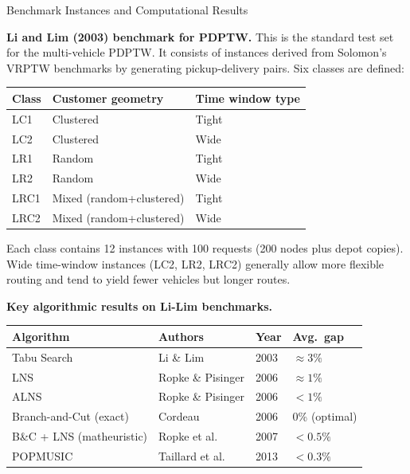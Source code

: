 \documentclass[aspectratio=169,10pt]{beamer}
\begin{document}
\begin{frame}[allowframebreaks]{Benchmark Instances and Computational Results}

  \textbf{Li and Lim (2003) benchmark for PDPTW.} This is the standard test set for
  the multi-vehicle PDPTW. It consists of instances derived from Solomon's VRPTW
  benchmarks by generating pickup-delivery pairs. Six classes are defined:

  \begin{center}
    \begin{tabular}{lll}
      \toprule
      \textbf{Class} & \textbf{Customer geometry} & \textbf{Time window type} \\
      \midrule
      LC1 & Clustered & Tight \\
      LC2 & Clustered & Wide \\
      LR1 & Random   & Tight \\
      LR2 & Random   & Wide \\
      LRC1 & Mixed (random+clustered) & Tight \\
      LRC2 & Mixed (random+clustered) & Wide \\
      \bottomrule
    \end{tabular}
  \end{center}

  Each class contains 12 instances with 100 requests (200 nodes plus depot copies).
  Wide time-window instances (LC2, LR2, LRC2) generally allow more flexible routing and
  tend to yield fewer vehicles but longer routes.

  \framebreak

  \textbf{Key algorithmic results on Li-Lim benchmarks.}

  \begin{center}\small
    \begin{tabular}{llll}
      \toprule
      \textbf{Algorithm} & \textbf{Authors} & \textbf{Year} & \textbf{Avg.\ gap} \\
      \midrule
      Tabu Search                  & Li \& Lim           & 2003 & $\approx 3\%$ \\
      LNS                          & Ropke \& Pisinger   & 2006 & $\approx 1\%$ \\
      ALNS                         & Ropke \& Pisinger   & 2006 & $<1\%$ \\
      Branch-and-Cut (exact)       & Cordeau             & 2006 & 0\% (optimal) \\
      B\&C + LNS (matheuristic)   & Ropke et al.        & 2007 & $<0.5\%$ \\
      POPMUSIC                     & Taillard et al.     & 2013 & $<0.3\%$ \\
      \bottomrule
    \end{tabular}
  \end{center}


\end{frame}
\end{document}
